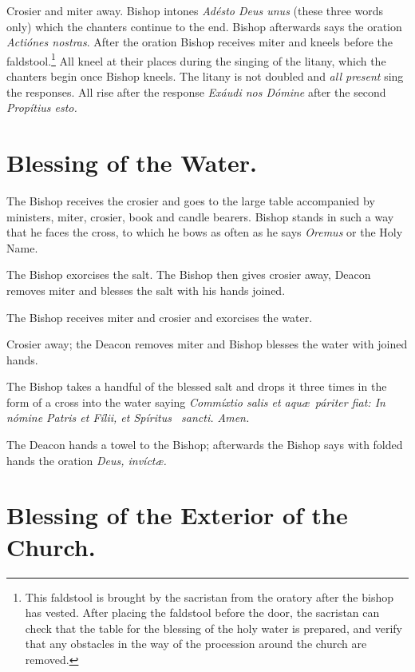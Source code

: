 \documentclass[letterpaper]{report}
\begin{document}
{    \rubric Crosier and miter away. Bishop intones \textit{Ad\'esto Deus unus}
    (these three words only) which the chanters continue to the end. Bishop
    afterwards says the oration \textit{Acti\'ones nostras}. After the oration
    Bishop receives miter and kneels before the faldstool.\footnote{This
    faldstool is brought by the sacristan from the oratory after the bishop has
    vested. After placing the faldstool before the door, the sacristan can
    check that the table for the blessing of the holy water is prepared, and
    verify that any obstacles in the way of the procession around the church
    are removed.} All kneel at their places during the singing of the litany,
    which the chanters begin once Bishop kneels. The litany is not doubled and
    \textit{all present} sing the responses. All rise after the response
    \textit{Ex\'audi nos D\'omine} after the second \textit{Prop\'itius esto.}

    \section{Blessing of the Water.}

    \rubric The Bishop receives the crosier and goes to the large table accompanied by
    ministers, miter, crosier, book and candle bearers. Bishop stands in such a way
    that he faces the cross, to which he bows as often as he says \textit{Oremus}
    or the Holy Name.

    \rubric The Bishop exorcises the salt. The Bishop then gives crosier away,
    Deacon removes miter and blesses the salt with his hands joined.

    \rubric The Bishop receives miter and crosier and exorcises the water.

    \rubric Crosier away; the Deacon removes miter and Bishop blesses the water
    with joined hands.

    \rubric The Bishop takes a handful of the blessed salt and drops it three
    times in the form of a cross into the water saying \textit{Commíxtio salis
    et aqu\ae\ páriter fiat: In nómine Pa\cross tris et Fí\cross lii, et
    Spíritus \cross\ sancti. \rbar Amen.}

    \rubric The Deacon hands a towel to the Bishop; afterwards the Bishop says
    with folded hands the oration \textit{Deus, invíct\ae.}

    \section{Blessing of the Exterior of the Church.}

}
\end{document}
